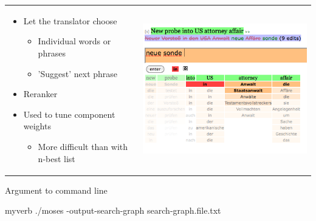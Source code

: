 \documentclass[landscape]{uedslides2C}
\begin{document}
\begin{tabular}{p{9cm}c}
\vspace{-12cm}
\begin{itemize}
\item  Let the translator choose
	\begin{itemize}
	\item Individual words or phrases
	\item 'Suggest' next phrase
	\end{itemize}
\item  Reranker
\item  Used to tune component weights
	\begin{itemize}
	\item More difficult than with n-best list
	\end{itemize}

\end{itemize}

&

\includegraphics[scale=1]{lattice-caitra.png}

\end{tabular}

\vspace{5mm}
\begin{center}
Argument to command line\\[2mm]
\begin{SaveVerbatim}{myverb}
 ./moses -output-search-graph search-graph.file.txt 
\end{SaveVerbatim}
\colorbox{gray}{}
\end{center}
\vspace{5mm}
\end{document}
